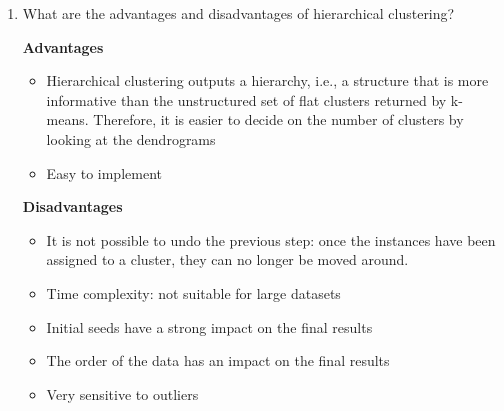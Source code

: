 \documentclass[12pt]{article}
\newenvironment{QandA}{\begin{enumerate}[label=\bfseries\arabic*.]\bfseries}
{\end{enumerate}}
\newenvironment{answered}{\par\normalfont\color{Sepia}}{}
\begin{document}
\begin{QandA}
    \item What are the advantages and disadvantages of hierarchical clustering?
    \begin{answered}
        \textbf{Advantages}
        \begin{itemize}
            \item Hierarchical clustering outputs a hierarchy, i.e., a
                structure that is more informative than the unstructured
                set of flat clusters returned by k-means. Therefore, it is
                easier to decide on the number of clusters by looking at the dendrograms
            \item Easy to implement
        \end{itemize}
        \textbf{Disadvantages}
        \begin{itemize}
            \item It is not possible to undo the previous step: once the
                instances have been assigned to a cluster, they can no
                longer be moved around.
            \item Time complexity: not suitable for large datasets
            \item Initial seeds have a strong impact on the final results
            \item The order of the data has an impact on the final results
            \item Very sensitive to outliers
        \end{itemize}
    \end{answered}

\end{QandA}
\end{document}
